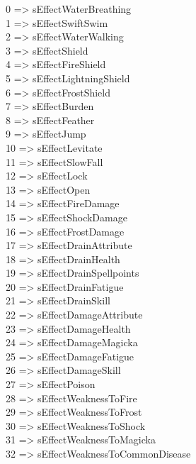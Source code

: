 \documentclass[
]{article}
\begin{document}
0 =\textgreater{} sEffectWaterBreathing\\
1 =\textgreater{} sEffectSwiftSwim\\
2 =\textgreater{} sEffectWaterWalking\\
3 =\textgreater{} sEffectShield\\
4 =\textgreater{} sEffectFireShield\\
5 =\textgreater{} sEffectLightningShield\\
6 =\textgreater{} sEffectFrostShield\\
7 =\textgreater{} sEffectBurden\\
8 =\textgreater{} sEffectFeather\\
9 =\textgreater{} sEffectJump\\
10 =\textgreater{} sEffectLevitate\\
11 =\textgreater{} sEffectSlowFall\\
12 =\textgreater{} sEffectLock\\
13 =\textgreater{} sEffectOpen\\
14 =\textgreater{} sEffectFireDamage\\
15 =\textgreater{} sEffectShockDamage\\
16 =\textgreater{} sEffectFrostDamage\\
17 =\textgreater{} sEffectDrainAttribute\\
18 =\textgreater{} sEffectDrainHealth\\
19 =\textgreater{} sEffectDrainSpellpoints\\
20 =\textgreater{} sEffectDrainFatigue\\
21 =\textgreater{} sEffectDrainSkill\\
22 =\textgreater{} sEffectDamageAttribute\\
23 =\textgreater{} sEffectDamageHealth\\
24 =\textgreater{} sEffectDamageMagicka\\
25 =\textgreater{} sEffectDamageFatigue\\
26 =\textgreater{} sEffectDamageSkill\\
27 =\textgreater{} sEffectPoison\\
28 =\textgreater{} sEffectWeaknessToFire\\
29 =\textgreater{} sEffectWeaknessToFrost\\
30 =\textgreater{} sEffectWeaknessToShock\\
31 =\textgreater{} sEffectWeaknessToMagicka\\
32 =\textgreater{} sEffectWeaknessToCommonDisease\\
\end{document}
